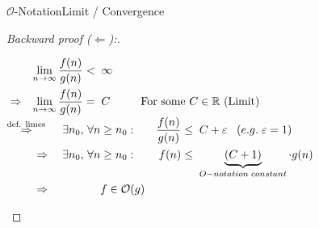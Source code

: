 \begin{frame}{$\mathcal{O}$-Notation}{Limit / Convergence}
  \begin{proof}[Backward proof ($\Leftarrow$):]
    \begin{center}
      \vspace{-0.5em}
      \begin{math}
        \begin{aligned}
          & {} & \lim_{n \to \infty} \frac{f(n)}{g(n)} &< \; \infty\\
          & \Rightarrow & \lim_{n \to \infty} \frac{f(n)}{g(n)} &= \; C &&
          \hspace*{1.5em}\text{For some } C \in \mathbb{R} \text{ (Limit)}
        \end{aligned}
      \end{math}
      \vspace{1.0em}\\
      \begin{math}
        \begin{aligned}
          \stackrel{\text{def. limes}}{\Rightarrow} \hspace*{0.5em} &&
          \exists n_0, \, \forall n \geq n_0: \hspace*{1.0em}&&
          \frac{f(n)}{g(n)} &\leq \; C + \varepsilon \;\;\; (e.g.\;\varepsilon = 1)\\
          \Rightarrow \; &&
          \exists n_0, \, \forall n \geq n_0: \hspace*{1.0em}&&
          f(n) &\leq \; \underbrace{(C + 1)}_{O-notation\;constant} \cdot g(n)\\
          \Rightarrow \; &&
          f \in \mathcal{O}(g)
          \qedhere
        \end{aligned}
      \end{math}
    \end{center}
  \end{proof}
\end{frame}


